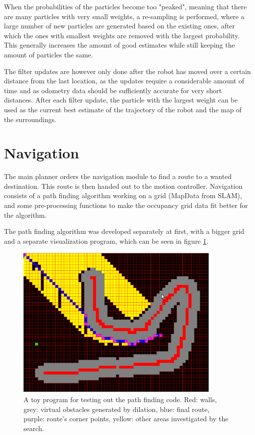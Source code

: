 \documentclass[a4paper,10pt]{article}
\begin{document}
When the probabilities of the particles become too "peaked", meaning that there are many particles with very small weights, a re-sampling is performed, where a large number of new particles are generated based on the existing ones, after which the ones with smallest weights are removed with the largest probability. This generally increases the amount of good estimates while still keeping the amount of particles the same.

The filter updates are however only done after the robot has moved over a certain distance from the last location, as the updates require a considerable amount of time and as odometry data should be sufficiently accurate for very short distances. After each filter update, the particle with the largest weight can be used as the current best estimate of the trajectory of the robot and the map of the surroundings.

\section{Navigation}

The main planner orders the navigation module to find a route to a wanted destination. This route is then handed out to the motion controller. Navigation consists of a path finding algorithm working on a grid (MapData from SLAM), and some pre-processing functions to make the occupancy grid data fit better for the algorithm.

The path finding algorithm was developed separately at first, with a bigger grid and a separate visualization program, which can be seen in figure \ref{navi_first_path}.

\begin{figure}[h]	%
\begin{center}
\includegraphics[width=10.0cm]{navi_1.eps}
\caption{A toy program for testing out the path finding code. Red: walls, grey: virtual obstacles generated by dilation, blue: final route, purple: route's corner points, yellow: other areas investigated by the search.}
\label{navi_first_path} %
\end{center}
\end{figure}
\end{document}
